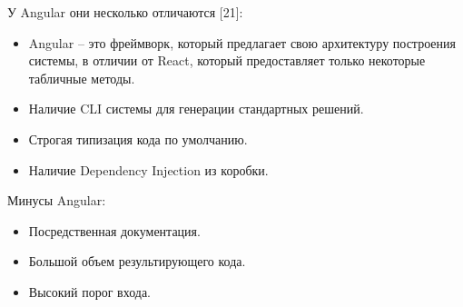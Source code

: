 У Angular они несколько отличаются [21]:

\begin{itemize}
    \item Angular – это фреймворк, который предлагает свою архитектуру построения системы, в отличии от React, который предоставляет только некоторые табличные методы.
    \item Наличие CLI системы для генерации стандартных решений.
    \item Строгая типизация кода по умолчанию.
    \item Наличие Dependency Injection из коробки.
\end{itemize}
Минусы Angular:
\begin{itemize}
    \item Посредственная документация.
    \item Большой объем результирующего кода.
    \item Высокий порог входа.
\end{itemize}


\clearpage



